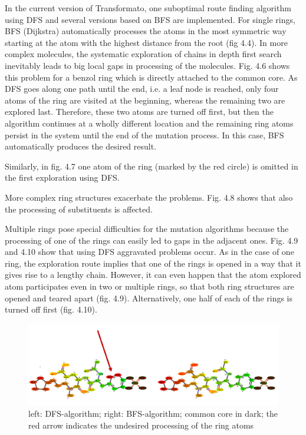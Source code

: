 In the current version of Transformato, one suboptimal route finding algorithm using DFS and several versions based on BFS are implemented.
For single rings, BFS (Dijkstra) automatically processes the atoms in the most symmetric way starting at the atom with the highest distance from the root (fig 4.4).
In more complex molecules, the systematic exploration of chains in
depth first search inevitably leads to big local gaps in processing
of the molecules. Fig. 4.6 shows this problem for a benzol ring which
is directly attached to the common core. As DFS goes along one path
until the end, i.e. a leaf node is reached, only four atoms of the
ring are visited at the beginning, whereas the remaining two are explored
last. Therefore, these two atoms are turned off first, but then the
algorithm continues at a wholly different location and the remaining
ring atoms persist in the system until the end of the mutation process.
In this case, BFS automatically produces the desired result. 

Similarly, in fig. 4.7 one atom of the ring (marked by the red circle)
is omitted in the first exploration using DFS.

More complex ring structures exacerbate the problems. Fig. 4.8 shows that also the processing of substituents is affected.

Multiple rings pose special difficulties for the mutation algorithms because
the processing of one of the rings can easily led to gaps in the adjacent
ones. Fig. 4.9 and 4.10 show that using DFS aggravated problems occur.
As in the case of one ring, the exploration route implies that one
of the rings is opened in a way that it gives rise to a lengthy chain.
However, it can even happen that the atom explored atom participates
even in two or multiple rings, so that both ring structures are opened
and teared apart (fig. 4.9). Alternatively, one half of each of the
rings is turned off first (fig. 4.10). 

\begin{figure}
\includegraphics[scale=0.4]{simple_ring_exampledfs2}\caption{left: DFS-algorithm; right: BFS-algorithm; common core in dark; the
red arrow indicates the undesired processing of the ring atoms}

\end{figure}

